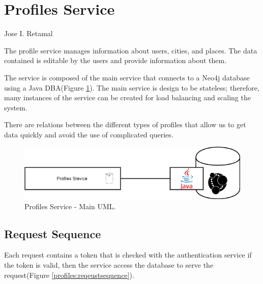\section{Profiles Service}{Jose I. Retamal }

\indent
\indent
The profile service manages information about users, cities, and places. The data contained is editable by the users and provide information about them. 

The service is composed of the main service that connects to a Neo4j database using a Java DBA(Figure \ref{profiles:profilesmaindiagram}). The main service is design to be stateless; therefore, many instances of the service can be created for load balancing and scaling the system. 

There are relations between the different types of profiles that allow us to get data quickly and avoid the use of complicated queries.

\begin{figure}[H]
	\begin{center}
		\includegraphics[width=120mm,scale=1]{img/profiles/profile-main-diagram.png}
		\caption{Profiles Service - Main UML.}
		\label{profiles:profilesmaindiagram}
	\end{center}
	
\end{figure}

\subsection{Request Sequence}

Each request contains a token that is checked with the authentication service if the token is valid, then the service access the database to serve the request(Figure \ref{profiles:reqeustsequence}).

